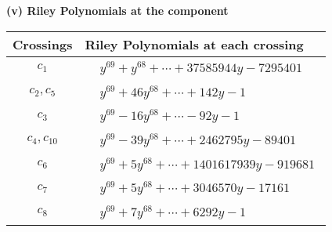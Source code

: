 \documentclass[1p]{elsarticle_modified}
\theoremstyle{definition}
\begin{document}
\newpage\renewcommand{\arraystretch}{1}
\flushleft \textbf{(v) Riley Polynomials at the component}\newline \\
\begin{tabular}{m{50pt}|m{274pt}}
Crossings & \hspace{64pt}Riley Polynomials at each crossing \\
\hline $$\begin{aligned}c_{1}\end{aligned}$$&$\begin{aligned}
&y^{69}+y^{68}+\cdots+37585944 y-7295401
\end{aligned}$\\
\hline $$\begin{aligned}c_{2},c_{5}\end{aligned}$$&$\begin{aligned}
&y^{69}+46 y^{68}+\cdots+142 y-1
\end{aligned}$\\
\hline $$\begin{aligned}c_{3}\end{aligned}$$&$\begin{aligned}
&y^{69}-16 y^{68}+\cdots-92 y-1
\end{aligned}$\\
\hline $$\begin{aligned}c_{4},c_{10}\end{aligned}$$&$\begin{aligned}
&y^{69}-39 y^{68}+\cdots+2462795 y-89401
\end{aligned}$\\
\hline $$\begin{aligned}c_{6}\end{aligned}$$&$\begin{aligned}
&y^{69}+5 y^{68}+\cdots+1401617939 y-919681
\end{aligned}$\\
\hline $$\begin{aligned}c_{7}\end{aligned}$$&$\begin{aligned}
&y^{69}+5 y^{68}+\cdots+3046570 y-17161
\end{aligned}$\\
\hline $$\begin{aligned}c_{8}\end{aligned}$$&$\begin{aligned}
&y^{69}+7 y^{68}+\cdots+6292 y-1
\end{aligned}$\\

\end{tabular}
\end{document}
